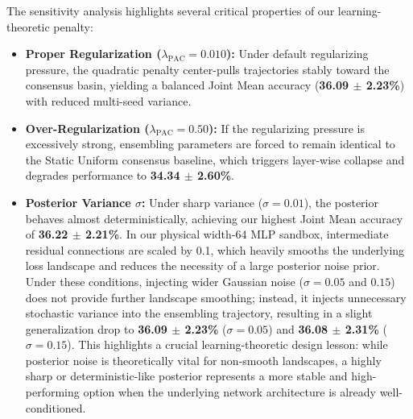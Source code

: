 The sensitivity analysis highlights several critical properties of our learning-theoretic penalty:
\begin{itemize}
    \item \textbf{Proper Regularization ($\lambda_{\text{PAC}} = 0.010$):} Under default regularizing pressure, the quadratic penalty center-pulls trajectories stably toward the consensus basin, yielding a balanced Joint Mean accuracy (\textbf{36.09 $\pm$ 2.23\%}) with reduced multi-seed variance.
    \item \textbf{Over-Regularization ($\lambda_{\text{PAC}} = 0.50$):} If the regularizing pressure is excessively strong, ensembling parameters are forced to remain identical to the Static Uniform consensus baseline, which triggers layer-wise collapse and degrades performance to \textbf{34.34 $\pm$ 2.60\%}.
    \item \textbf{Posterior Variance $\sigma$:} Under sharp variance ($\sigma = 0.01$), the posterior behaves almost deterministically, achieving our highest Joint Mean accuracy of \textbf{36.22 $\pm$ 2.21\%}. In our physical width-64 MLP sandbox, intermediate residual connections are scaled by 0.1, which heavily smooths the underlying loss landscape and reduces the necessity of a large posterior noise prior. Under these conditions, injecting wider Gaussian noise ($\sigma = 0.05$ and $0.15$) does not provide further landscape smoothing; instead, it injects unnecessary stochastic variance into the ensembling trajectory, resulting in a slight generalization drop to \textbf{36.09 $\pm$ 2.23\%} ($\sigma=0.05$) and \textbf{36.08 $\pm$ 2.31\%} ($\sigma=0.15$). This highlights a crucial learning-theoretic design lesson: while posterior noise is theoretically vital for non-smooth landscapes, a highly sharp or deterministic-like posterior represents a more stable and high-performing option when the underlying network architecture is already well-conditioned.
\end{itemize}